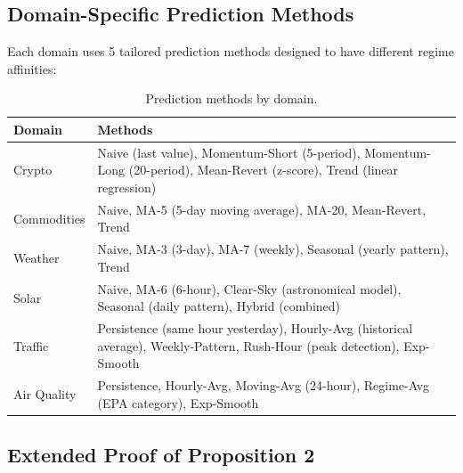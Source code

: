 \documentclass{article}
\begin{document}
\subsection{Domain-Specific Prediction Methods}

Each domain uses 5 tailored prediction methods designed to have different regime affinities:

\begin{table}[h]
\centering
\small
\caption{Prediction methods by domain.}
\begin{tabular}{lp{10cm}}
\toprule
\textbf{Domain} & \textbf{Methods} \\
\midrule
Crypto & Naive (last value), Momentum-Short (5-period), Momentum-Long (20-period), Mean-Revert (z-score), Trend (linear regression) \\
Commodities & Naive, MA-5 (5-day moving average), MA-20, Mean-Revert, Trend \\
Weather & Naive, MA-3 (3-day), MA-7 (weekly), Seasonal (yearly pattern), Trend \\
Solar & Naive, MA-6 (6-hour), Clear-Sky (astronomical model), Seasonal (daily pattern), Hybrid (combined) \\
Traffic & Persistence (same hour yesterday), Hourly-Avg (historical average), Weekly-Pattern, Rush-Hour (peak detection), Exp-Smooth \\
Air Quality & Persistence, Hourly-Avg, Moving-Avg (24-hour), Regime-Avg (EPA category), Exp-Smooth \\
\bottomrule
\end{tabular}
\end{table}

\subsection{Extended Proof of Proposition 2}
\end{document}
